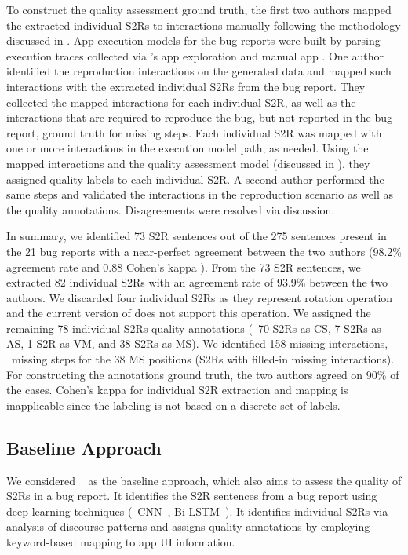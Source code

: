 To construct the quality assessment ground truth, the first two authors mapped the extracted individual S2Rs to  interactions manually following the methodology discussed in . App execution models for the bug reports were built by parsing execution traces collected via \CrashScope's app exploration and manual app .  
One author identified the reproduction interactions on the generated data and mapped such interactions with the extracted individual S2Rs from the bug report. 
They collected the mapped interactions for each individual S2R, as well as the interactions that are required to reproduce the bug, but not reported in the bug report, \ie ground truth for missing steps. 
Each individual S2R was mapped with one or more interactions in the execution model path, as needed. Using the mapped interactions and the quality assessment model (discussed in ), they assigned quality labels to each individual S2R. 
A second author performed the same steps and validated the interactions in the reproduction scenario as well as the quality annotations.  Disagreements were resolved via discussion.

In summary, we identified 73 S2R sentences out of the 275 sentences present in the 21 bug reports with a near-perfect agreement between the two authors (98.2\% agreement rate and 0.88 Cohen's kappa \cite{Cohen}). 
From the 73 S2R sentences, we extracted 82 individual S2Rs with an agreement rate of 93.9\% between the two authors.
We discarded four individual S2Rs as they represent rotation operation and the current version of \tool does not support this operation. 
We assigned the remaining 78 individual S2Rs quality annotations (\ie\ 70 S2Rs as CS, 7 S2Rs as AS, 1 S2R as VM, and 38 S2Rs as MS). 
We identified 158 missing interactions, \ie\ missing steps for the 38 MS positions (\ie S2Rs with filled-in missing interactions). 
For constructing the annotations ground truth, the two authors agreed on 90\% of the cases. Cohen's kappa for individual S2R extraction and mapping is inapplicable since the labeling is not based on a discrete set of labels. 

\subsection{Baseline Approach}

We considered \EulerC~\cite{Chaparro2019} as the baseline approach, which also aims to assess the quality of S2Rs in a bug report. 
It identifies the S2R sentences from a bug report using deep learning techniques (\eg\ CNN~\cite{o2015introduction}, Bi-LSTM~\cite{zhou2016attention}). 
It identifies individual S2Rs via analysis of discourse patterns and assigns quality annotations by employing keyword-based mapping to app UI information.  

